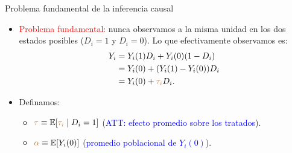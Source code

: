 \documentclass[10pt, xcolor=dvipsnames]{beamer}
\begin{document}
\begin{frame}{Problema fundamental de la inferencia causal}
\begin{itemize}
    \item  \textcolor{red}{Problema fundamental:} nunca observamos a la misma unidad en los dos estados posibles (\(D_i=1\) y \(D_i=0\)). Lo que efectivamente observamos es:
    \begin{align*}
    \begin{split}
    Y_i &= Y_i(1) D_i + Y_i(0) (1-D_i)  \\
    &= Y_i(0) + (Y_i(1)-Y_i(0)) D_i \\
    &= Y_i(0) + \textcolor{brown}{\tau_i} D_i.
    \end{split}
    \end{align*}
    \item Definamos:
    \begin{itemize}
        \item \(\textcolor{brown}{\tau} \equiv \operatorname{\mathbb{E}}[\textcolor{brown}{\tau_i} \mid D_i=1]\) \hfill (\textcolor{blue}{ATT: efecto promedio sobre los tratados}).
        \item \(\textcolor{brown}{\alpha} \equiv \operatorname{\mathbb{E}}[Y_i(0)]\) \hfill (\textcolor{blue}{promedio poblacional de \(Y_i(0)\)}).
    \end{itemize}
\end{itemize}
\end{frame}
\end{document}
